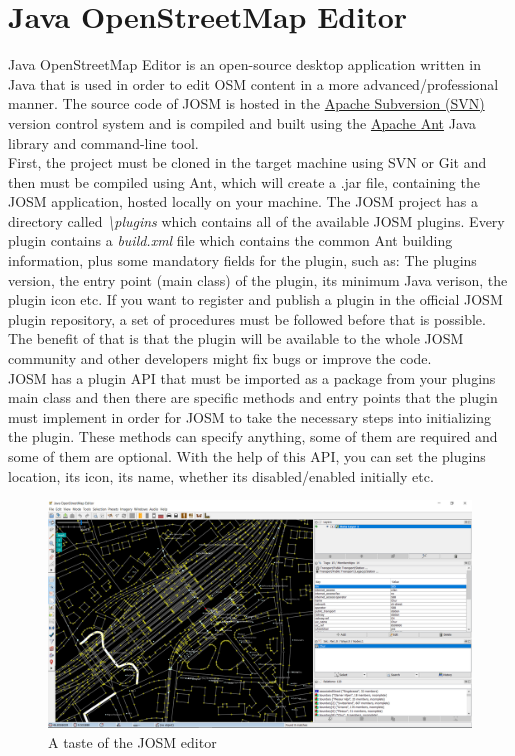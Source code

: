 \section{Java OpenStreetMap Editor}
Java OpenStreetMap Editor is an open-source desktop application written in Java that is used in order to edit OSM content in a more advanced/professional manner. The source code of JOSM is hosted in the \href{https://subversion.apache.org/}{Apache Subversion (SVN)} version control system and is compiled and built using the \href{https://ant.apache.org/}{Apache Ant} Java library and command-line tool.\\
\newline
First, the project must be cloned in the target machine using SVN or Git and then must be compiled using Ant, which will create a .jar file, containing the JOSM application, hosted locally on your machine. The JOSM project has a directory called \textit{\textbackslash plugins} which contains all of the available JOSM plugins. Every plugin contains a \textit{build.xml} file which contains the common Ant building information, plus some mandatory fields for the plugin, such as: The plugins version, the entry point (main class) of the plugin, its minimum Java verison, the plugin icon etc. If you want to register and publish a plugin in the official JOSM plugin repository, a set of procedures must be followed before that is possible. The benefit of that is that the plugin will be available to the whole JOSM community and other developers might fix bugs or improve the code.\\
\newline
JOSM has a plugin API that must be imported as a package from your plugins main class and then there are specific methods and entry points that the plugin must implement in order for JOSM to take the necessary steps into initializing the plugin. These methods can specify anything, some of them are required and some of them are optional. With the help of this API, you can set the plugins location, its icon, its name, whether its disabled/enabled initially etc. 
\begin{figure}[H]
\includegraphics[width=\linewidth]{./Images/Implementation/josm_view.png}
	\caption{A taste of the JOSM editor}
\end{figure}
